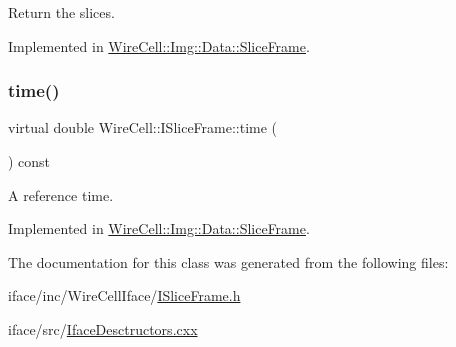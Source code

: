 Return the slices. 



Implemented in \hyperlink{class_wire_cell_1_1_img_1_1_data_1_1_slice_frame_a5fc36949d12f7fb66ef1b6decdf774b5}{Wire\+Cell\+::\+Img\+::\+Data\+::\+Slice\+Frame}.

\mbox{\label{class_wire_cell_1_1_i_slice_frame_ae0ac97f27ac3783656dd51a31ccbf69b}} 
\subsubsection{\texorpdfstring{time()}{time()}}
{\footnotesize\ttfamily virtual double Wire\+Cell\+::\+I\+Slice\+Frame\+::time (\begin{DoxyParamCaption}{ }\end{DoxyParamCaption}) const\hspace{0.3cm}{\ttfamily [pure virtual]}}



A reference time. 



Implemented in \hyperlink{class_wire_cell_1_1_img_1_1_data_1_1_slice_frame_ac93b4f236d7982be45074f9358fe5e0f}{Wire\+Cell\+::\+Img\+::\+Data\+::\+Slice\+Frame}.



The documentation for this class was generated from the following files\+:\begin{DoxyCompactItemize}
\item 
iface/inc/\+Wire\+Cell\+Iface/\hyperlink{_i_slice_frame_8h}{I\+Slice\+Frame.\+h}\item 
iface/src/\hyperlink{_iface_desctructors_8cxx}{Iface\+Desctructors.\+cxx}\end{DoxyCompactItemize}
